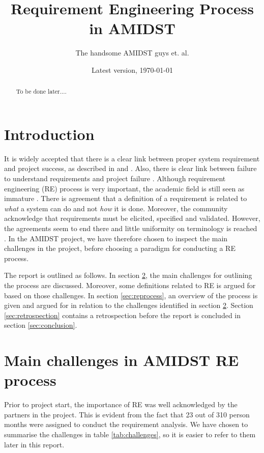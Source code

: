 \documentclass[11pt, oneside]{article}   	%
\title{Requirement Engineering Process in AMIDST}
\author{The handsome AMIDST guys et. al.}
\date{Latest version, \today}							%
\begin{document}
\maketitle

\begin{abstract}
To be done later....
\end{abstract}

\section{Introduction}

It is widely accepted that there is a clear link between proper system requirement and project success, as described in  \cite{Boe91} and \cite{Jac99}.  Also, there is clear link between failure to understand requirements and project failure \cite{Ewu03}.  Although requirement engineering (RE) process is very important, the academic field is still seen as immature \cite{Poh96}. There is agreement that a definition of a requirement is related to \emph{what} a system can do and not \emph{how} it is done.  Moreover, the community acknowledge that requirements must be elicited, specified and validated.  However, the agreements seem to end there and little uniformity on terminology is reached \cite{Poh96}. In the AMIDST project, we have therefore chosen to inspect the main challenges in the project, before choosing a paradigm for conducting a RE process.

The report is outlined as follows.  In section \ref{sec:challenges}, the main challenges for outlining the process are discussed.  Moreover, some definitions related to RE is argued for based on those challenges.  In section \ref{sec:reprocess}, an overview of the process is given and argued for in relation to the challenges identified in section \ref{sec:challenges}.  Section \ref{sec:retrospection} contains a retrospection before the report is concluded in section \ref{sec:conclusion}.

\section{Main challenges in AMIDST RE process}
\label{sec:challenges}

Prior to project start, the importance of RE was well acknowledged by the partners in the project.  This is evident from the fact that 23 out of 310 person months were assigned to conduct the requirement analysis.  We have chosen to summarise the challenges in table \ref{tab:challenges}, so it is easier to refer to them later in this report.
\end{document}
